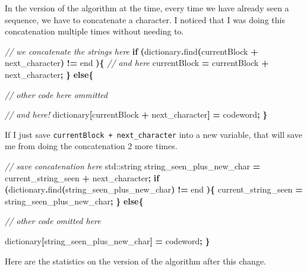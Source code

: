 \documentclass[12pt,twoside]{reedthesis}
\newenvironment{Shaded}{\begin{snugshade}}{\end{snugshade}}
\newcommand{\BuiltInTok}[1]{#1}
\newcommand{\CommentTok}[1]{\textcolor[rgb]{0.56,0.35,0.01}{\textit{#1}}}
\newcommand{\ControlFlowTok}[1]{\textcolor[rgb]{0.13,0.29,0.53}{\textbf{#1}}}
\newcommand{\NormalTok}[1]{#1}
\newcommand{\OperatorTok}[1]{\textcolor[rgb]{0.81,0.36,0.00}{\textbf{#1}}}
\begin{document}
In the version of the algorithm at the time, every time we have already seen a sequence, we have to concatenate a character. I noticed that I was doing this concatenation multiple times without needing to.
\begin{Shaded}
\begin{Highlighting}[]
\CommentTok{// we concatenate the strings here}
\ControlFlowTok{if} \OperatorTok{(}\NormalTok{dictionary}\OperatorTok{.}\NormalTok{find}\OperatorTok{(}\NormalTok{currentBlock }\OperatorTok{+}\NormalTok{ next\_character}\OperatorTok{)} \OperatorTok{!=}\NormalTok{ end }\OperatorTok{)\{}
    \CommentTok{// and here}
\NormalTok{    currentBlock }\OperatorTok{=}\NormalTok{ currentBlock }\OperatorTok{+}\NormalTok{ next\_character}\OperatorTok{;}
\OperatorTok{\}}
\ControlFlowTok{else}\OperatorTok{\{}

    \CommentTok{// other code here ommitted}


    \CommentTok{// and here! }
\NormalTok{    dictionary}\OperatorTok{[}\NormalTok{currentBlock }\OperatorTok{+}\NormalTok{ next\_character}\OperatorTok{]} \OperatorTok{=}\NormalTok{ codeword}\OperatorTok{;}
\OperatorTok{\}}
\end{Highlighting}
\end{Shaded}
If I just save \texttt{currentBlock\ +\ next\_character} into a new variable, that will save me from doing the concatenation 2 more times.
\begin{Shaded}
\begin{Highlighting}[]
\CommentTok{// save concatenation here}
\BuiltInTok{std::}\NormalTok{string}\OperatorTok{ }\NormalTok{string\_seen\_plus\_new\_char }\OperatorTok{=}\NormalTok{ current\_string\_seen }\OperatorTok{+}\NormalTok{ next\_character}\OperatorTok{;}
\ControlFlowTok{if} \OperatorTok{(}\NormalTok{dictionary}\OperatorTok{.}\NormalTok{find}\OperatorTok{(}\NormalTok{string\_seen\_plus\_new\_char}\OperatorTok{)} \OperatorTok{!=}\NormalTok{ end }\OperatorTok{)\{}
\NormalTok{    current\_string\_seen }\OperatorTok{=}\NormalTok{ string\_seen\_plus\_new\_char}\OperatorTok{;}
\OperatorTok{\}}
\ControlFlowTok{else}\OperatorTok{\{}

\CommentTok{// other code omitted here}

\NormalTok{    dictionary}\OperatorTok{[}\NormalTok{string\_seen\_plus\_new\_char}\OperatorTok{]} \OperatorTok{=}\NormalTok{ codeword}\OperatorTok{;}
\OperatorTok{\}}
\end{Highlighting}
\end{Shaded}
Here are the statistics on the version of the algorithm after this change.
\end{document}
